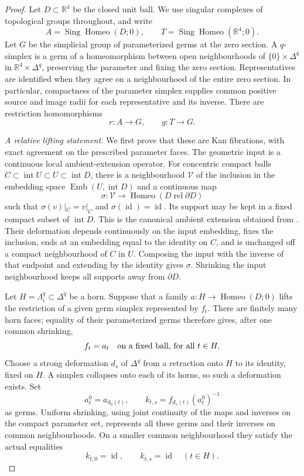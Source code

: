\begin{proof}
Let $D\subset\mathbb R^4$ be the closed unit ball.  We use singular
complexes of topological groups throughout, and write
\[
 A=\operatorname{Sing}\operatorname{Homeo}(D;0),\qquad
 T=\operatorname{Sing}\operatorname{Homeo}(\mathbb R^4;0).
\]
Let $G$ be the simplicial group of parameterized germs at the zero
section.  A $q$-simplex is a germ of a homeomorphism between open
neighbourhoods of $\{0\}\times\Delta^q$ in
$\mathbb R^4\times\Delta^q$, preserving the parameter and fixing
the zero section.  Representatives are identified when they agree
on a neighbourhood of the entire zero section.  In particular,
compactness of the parameter simplex supplies common positive
source and image radii for each representative and its inverse.
There are restriction homomorphisms
\[
                       r:A\longrightarrow G,
                 \qquad g:T\longrightarrow G.
\]

\medskip\noindent\textit{A relative lifting statement.}
We first prove that these are Kan fibrations, with exact agreement
on the prescribed parameter faces.  The geometric input is a
continuous local ambient-extension operator.  For concentric compact
balls $C\subset\operatorname{int}U\subset U\subset\operatorname{int}D$,
there is a neighbourhood $\mathcal V$ of the inclusion in the
embedding space $\operatorname{Emb}(U,\operatorname{int}D)$ and a
continuous map
\[
 \sigma:\mathcal V\longrightarrow
       \operatorname{Homeo}(D\;\mathrm{rel}\;\partial D)
\]
such that $\sigma(v)|_C=v|_C$ and
$\sigma(\operatorname{id})=\operatorname{id}$.  Its support may be
kept in a fixed compact subset of $\operatorname{int}D$.
This is the canonical ambient extension obtained from
\cite[Theorem~5.1, p.~70; proof of Corollary~1.2, p.~79]
{EdwardsKirby1971}.  Their deformation depends continuously on the
input embedding, fixes the inclusion, ends at an embedding equal to
the identity on $C$, and is unchanged off a compact neighbourhood
of $C$ in $U$.  Composing the input with the inverse of that endpoint
and extending by the identity gives $\sigma$.  Shrinking the input
neighbourhood keeps all supports away from $\partial D$.

Let $H=\Lambda_i^q\subset\Delta^q$ be a horn.  Suppose that a
family $a:H\to\operatorname{Homeo}(D;0)$ lifts the restriction of
a given germ simplex represented by $f_t$.  There are finitely
many horn faces; equality of their parameterized germs therefore
gives, after one common shrinking,
\[
 f_t=a_t\quad\hbox{on a fixed ball, for all }t\in H.
\]
Choose a strong deformation $d_s$ of $\Delta^q$ from a retraction
onto $H$ to its identity, fixed on $H$.  A simplex collapses onto
each of its horns, so such a deformation exists.  Set
\[
 a^0_t=a_{d_0(t)},\qquad
 k_{t,s}=f_{d_s(t)}(a^0_t)^{-1}
\]
as germs.  Uniform shrinking, using joint continuity of the maps
and inverses on the compact parameter set, represents all these
germs and their inverses on common neighbourhoods.  On a smaller
common neighbourhood they satisfy the actual equalities
\[
       k_{t,0}=\operatorname{id},\qquad
       k_{t,s}=\operatorname{id}\quad(t\in H).
\]


\end{proof}
